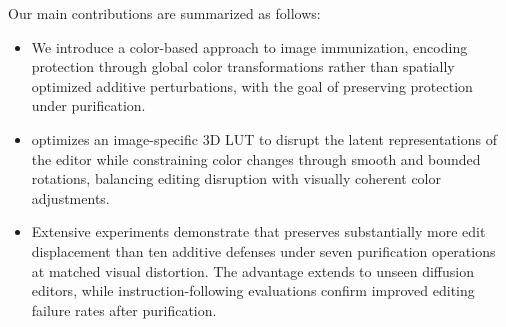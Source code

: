 Our main contributions are summarized as follows:

\begin{itemize}
    \item We introduce a color-based approach to image immunization, encoding protection through global color transformations rather than spatially optimized additive perturbations, with the goal of preserving protection under purification.

    \item \capg{} optimizes an image-specific 3D LUT to disrupt the latent representations of the editor while constraining color changes through smooth and bounded rotations, balancing editing disruption with visually coherent color adjustments.

    \item Extensive experiments demonstrate that \capg{} preserves substantially more edit displacement than ten additive defenses under seven purification operations at matched visual distortion. The advantage extends to unseen diffusion editors, while instruction-following evaluations confirm improved editing failure rates after purification.
\end{itemize}




